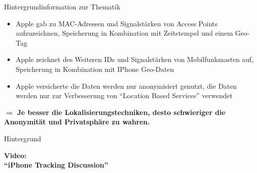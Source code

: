 \begin{frame}{Hintergrundinformation zur Thematik}
\begin{itemize}
  \item Apple gab zu MAC-Adressen und Signalstärken von Access Points aufzuzeichnen, Speicherung in Kombination mit Zeitstempel und einem Geo-Tag
  \item Apple zeichnet des Weiteren IDs und Signalstärken von Mobilfunkmasten auf, Speicherung in Kombination mit IPhone Geo-Daten
  \item Apple versicherte die Daten werden nur anonymisiert genutzt, die Daten werden nur zur Verbesserung von "`Location Based Services"' verwendet
\end{itemize}
$\Rightarrow$ \textbf{Je besser die Lokalisierungstechniken, desto schwieriger die Anonymität und Privatsphäre zu wahren.}
\end{frame}

\begin{frame}{Hintergrund}
\begin{center}
  \huge \textbf{Video:\\\vspace{1cm} "`iPhone Tracking Discussion"'}
\end{center}
\vspace{2cm}
\begin{center}
  \href{run:iphone.mp4}{}
\end{center}
\end{frame}

